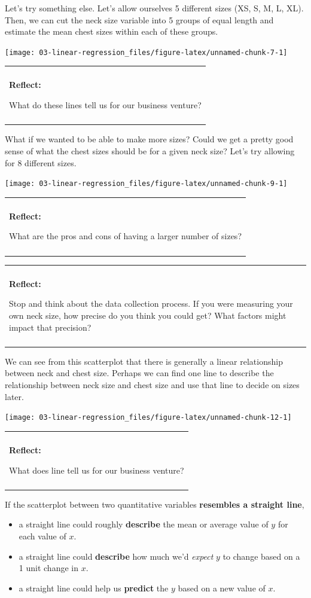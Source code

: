 \documentclass[
]{book}
\providecommand{\tightlist}{%
  \setlength{\itemsep}{0pt}\setlength{\parskip}{0pt}}
\newenvironment{reflect}
{
    \begin{center}
    
    \begin{tabular}{|p{0.8\textwidth}|}
    \rowcolor{LightBlue}
    \hline\\
    \rowcolor{LightBlue}
    \textbf{Reflect:}
}
{
    \\\rowcolor{LightBlue}
    \\\hline
    \end{tabular} 
    \end{center}
}
\begin{document}
Let's try something else. Let's allow ourselves 5 different sizes (XS, S, M, L, XL). Then, we can cut the neck size variable into 5 groups of equal length and estimate the mean chest sizes within each of these groups.

\begin{center}\texttt{[image: 03-linear-regression\_files/figure-latex/unnamed-chunk-7-1]} \end{center}

\begin{reflect}
What do these lines tell us for our business venture?
\end{reflect}

What if we wanted to be able to make more sizes? Could we get a pretty good sense of what the chest sizes should be for a given neck size? Let's try allowing for 8 different sizes.

\begin{center}\texttt{[image: 03-linear-regression\_files/figure-latex/unnamed-chunk-9-1]} \end{center}

\begin{reflect}
What are the pros and cons of having a larger number of sizes?
\end{reflect}

\begin{reflect}
Stop and think about the data collection process. If you were measuring
your own neck size, how precise do you think you could get? What factors
might impact that precision?
\end{reflect}

We can see from this scatterplot that there is generally a linear relationship between neck and chest size. Perhaps we can find one line to describe the relationship between neck size and chest size and use that line to decide on sizes later.

\begin{center}\texttt{[image: 03-linear-regression\_files/figure-latex/unnamed-chunk-12-1]} \end{center}

\begin{reflect}
What does line tell us for our business venture?
\end{reflect}

If the scatterplot between two quantitative variables \textbf{resembles a straight line},

\begin{itemize}
\tightlist
\item
  a straight line could roughly \textbf{describe} the mean or average value of \(y\) for each value of \(x\).
\item
  a straight line could \textbf{describe} how much we'd \emph{expect} \(y\) to change based on a 1 unit change in \(x\).
\item
  a straight line could help us \textbf{predict} the \(y\) based on a new value of \(x\).
\end{itemize}
\end{document}
